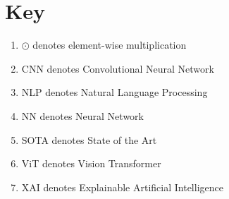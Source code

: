 \chapter*{Key}

\begin{enumerate}
    \item $\odot$ denotes element-wise multiplication
    \item CNN denotes Convolutional Neural Network
    \item NLP denotes Natural Language Processing
    \item NN denotes Neural Network
    \item SOTA denotes State of the Art
    \item ViT denotes Vision Transformer
    \item XAI denotes Explainable Artificial Intelligence
\end{enumerate}